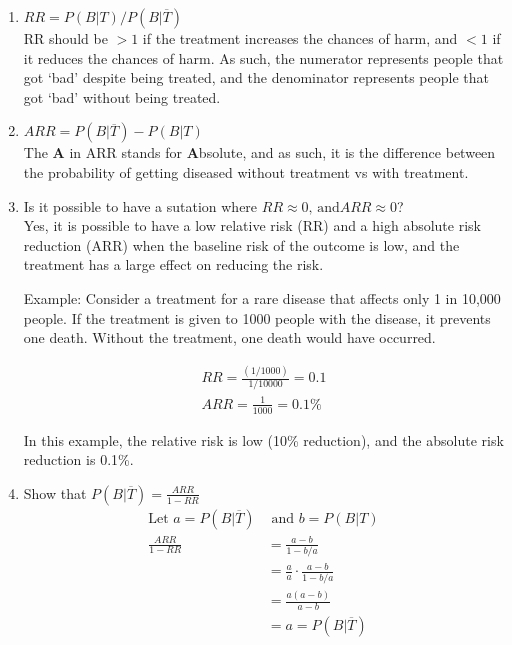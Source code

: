 \documentclass{article}
\begin{document}
\begin{enumerate}[label=\alph*)]
    \item \(RR = P(B \vert T) / P(B \vert \overline{T})\) \\
          RR should be \(> 1\) if the treatment increases the chances of harm, and \(< 1\) if it reduces the chances of harm.
          As such, the numerator represents people that got `bad' despite being treated, and the denominator represents people that got `bad' without being treated.
    \item \(ARR = P(B \vert \overline{T}) - P(B \vert T)\) \\
          The \textbf{A} in ARR stands for \textbf{A}bsolute, and as such, it is the difference between the probability of getting diseased without treatment vs with treatment.
    \item Is it possible to have a sutation where \(RR \approx 0 \text{, and} ARR \approx 0\)? \\
          Yes, it is possible to have a low relative risk (RR) and a high absolute risk reduction (ARR) when the baseline risk of the outcome is low, and the treatment has a large effect on reducing the risk.

          Example: Consider a treatment for a rare disease that affects only 1 in 10,000 people. If the treatment is given to 1000 people with the disease, it prevents one death. Without the treatment, one death would have occurred.

          \begin{align*}
              RR = \frac{(1/1000)}{1/10000} = 0.1 \\
              ARR = \frac{1}{1000} = 0.1\%
          \end{align*}

          In this example, the relative risk is low (10\% reduction), and the absolute risk reduction is 0.1\%.

    \item Show that \(P(B \vert \overline{T}) = \frac{ARR}{1-RR}\)
          \begin{align*}
              \text{Let } a = P(B \vert \overline{T}) & \text{ and } b = P(B \vert T)           \\
              \frac{
                  ARR
              }{
                  1-RR
              }                                       & = \frac{a - b}{ 1 - b/a}                \\
                                                      & = \frac{a}{a} \cdot \frac{a-b}{1 - b/a} \\
                                                      & = \frac{a(a-b)}{a-b}                    \\
                                                      & = a =P(B \vert \overline{T})
          \end{align*}
\end{enumerate}
\end{document}
